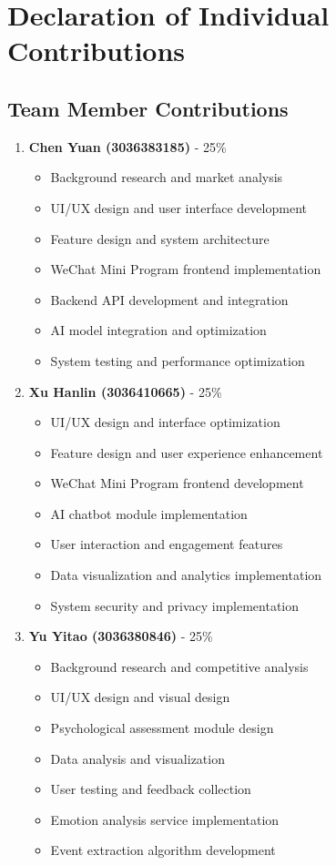 \appendix

\section{Declaration of Individual Contributions}
\label{sec:contributions}

\subsection{Team Member Contributions}

\begin{enumerate}
    \item \textbf{Chen Yuan (3036383185)} - 25\%
    \begin{itemize}
        \item Background research and market analysis
        \item UI/UX design and user interface development
        \item Feature design and system architecture
        \item WeChat Mini Program frontend implementation
        \item Backend API development and integration
        \item AI model integration and optimization
        \item System testing and performance optimization
    \end{itemize}
    
    \item \textbf{Xu Hanlin (3036410665)} - 25\%
    \begin{itemize}
        \item UI/UX design and interface optimization
        \item Feature design and user experience enhancement
        \item WeChat Mini Program frontend development
        \item AI chatbot module implementation
        \item User interaction and engagement features
        \item Data visualization and analytics implementation
        \item System security and privacy implementation
    \end{itemize}
    
    \item \textbf{Yu Yitao (3036380846)} - 25\%
    \begin{itemize}
        \item Background research and competitive analysis
        \item UI/UX design and visual design
        \item Psychological assessment module design
        \item Data analysis and visualization
        \item User testing and feedback collection
        \item Emotion analysis service implementation
        \item Event extraction algorithm development
    \end{itemize}
    

\end{enumerate}
